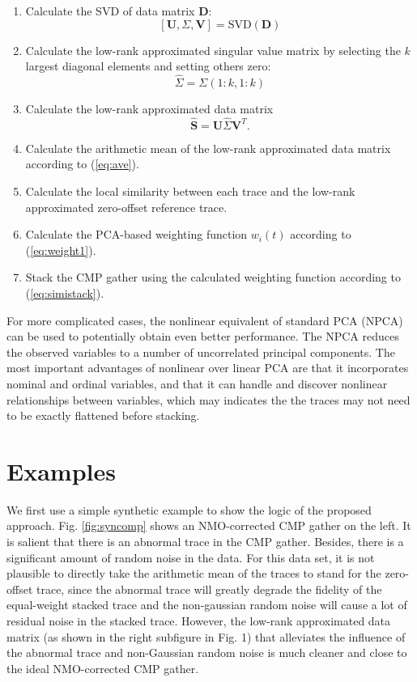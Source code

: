 \begin{enumerate}
\item Calculate the SVD of data matrix $\mathbf{D}$:
\begin{equation}
\label{eq:svd}
[\mathbf{U},\Sigma,\mathbf{V}]=\text{SVD}(\mathbf{D})
\end{equation}
\item Calculate the low-rank approximated singular value matrix by selecting the $k$ largest diagonal elements and setting others zero:
\begin{equation}
\label{eq:singular}
\hat{\Sigma} = \Sigma(1:k,1:k)
\end{equation}
\item Calculate the low-rank approximated data matrix
\begin{equation}
\label{eq:lr}
\hat{\mathbf{S}} = \mathbf{U}\hat{\Sigma}\mathbf{V}^T.
\end{equation}
\item Calculate the arithmetic mean of the low-rank approximated data matrix according to (\ref{eq:ave}).
\item Calculate the local similarity between each trace and the low-rank approximated zero-offset reference trace.
\item Calculate the PCA-based weighting function $w_i(t)$ according to (\ref{eq:weight1}).
\item Stack the CMP gather using the calculated weighting function according to (\ref{eq:simistack}).
\end{enumerate}
For more complicated cases, the nonlinear equivalent of standard PCA (NPCA) can be used to potentially obtain even better performance. The NPCA reduces the observed variables to a number of uncorrelated principal components. The most important advantages of nonlinear over linear PCA are that it incorporates nominal and ordinal variables, and that it can handle and discover nonlinear relationships between variables, which may indicates the the traces may not need to be exactly flattened before stacking.

\section{Examples}

We first use a simple synthetic example to show the logic of the proposed approach. Fig. \ref{fig:syncomp} shows an NMO-corrected CMP gather on the left. It is salient that there is an abnormal trace in the CMP gather. Besides, there is a significant amount of random noise in the data. For this data set, it is not plausible to directly take the arithmetic mean of the traces to stand for the zero-offset trace, since the abnormal trace will greatly degrade the fidelity of the equal-weight stacked trace and the non-gaussian random noise will cause a lot of residual noise in the stacked trace. However, the low-rank approximated data matrix (as shown in the right subfigure in Fig. 1) that alleviates the influence of the abnormal trace and non-Gaussian random noise is much cleaner and close to the ideal NMO-corrected CMP gather.  

